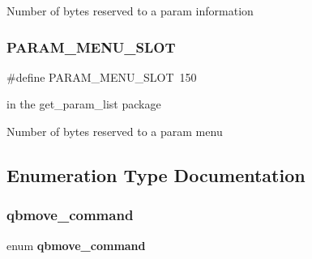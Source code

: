 Number of bytes reserved to a param information \mbox{\label{commands_8h_a3bab5133f6aa363d84307b39e17b0d74}} 
\subsubsection{P\+A\+R\+A\+M\+\_\+\+M\+E\+N\+U\+\_\+\+S\+L\+OT}
{\footnotesize\ttfamily \#define P\+A\+R\+A\+M\+\_\+\+M\+E\+N\+U\+\_\+\+S\+L\+OT~150}



in the get\+\_\+param\+\_\+list package 

Number of bytes reserved to a param menu 

\subsection{Enumeration Type Documentation}
\mbox{\label{commands_8h_abf0494aabdc65d654a54044eddc9210b}} 
\subsubsection{qbmove\+\_\+command}
{\footnotesize\ttfamily enum \textbf{ qbmove\+\_\+command}}

